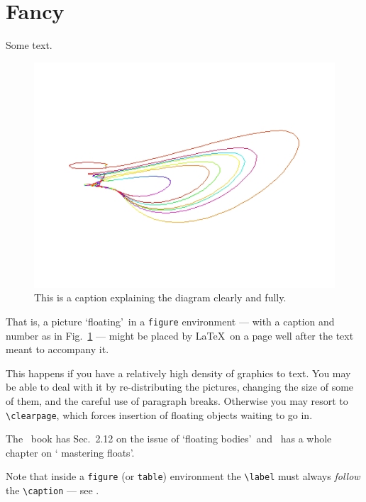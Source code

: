 \section{Fancy}
Some text.
\par
\begin{figure}[ht]\centering
  \includegraphics[width=.7\textwidth]{pic3.jpg}
  \caption{This is a caption explaining the diagram
clearly and fully.}\label{fig:pic}
\end{figure}
That is, a picture \lq floating\rq\ in a \texttt{figure} environment
--- with a caption and number as in Fig.~\ref{fig:pic} --- might be
placed by \LaTeX\ on a page well after the text meant to accompany it.
\par
This happens if you have a relatively high density of graphics to
text. You may be able to deal with it by re-distributing the
pictures, changing the size of some of them, and the careful use of
paragraph breaks. Otherwise you may resort to \verb+\clearpage+,
which forces insertion of floating objects waiting to go in.
\par
The \nss\ book \cite{NSS} has Sec.~2.12 on the issue of \lq floating
bodies\rq\ and \comp\ has a whole chapter \cite[Chap.~6]{MG} on \lq
mastering floats'.
\par
Note that inside a \verb+figure+ (or \verb+table+) environment the
\verb+\label+ must always {\em follow} the \verb+\caption+ --- see
\cite[p.~67]{MG}.
\par
